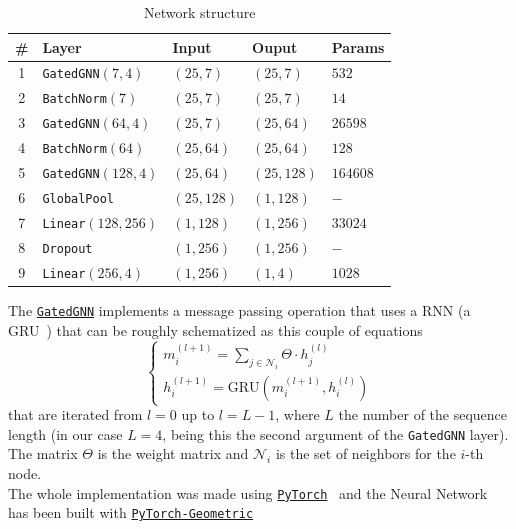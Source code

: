 \documentclass[a4paper]{article}
\begin{document}
\begin{table}[h]
\begin{tabular}{cllll}
\toprule
\# & Layer            & Input     & Ouput     & Params \\
\midrule
1      & \texttt{GatedGNN}$(7,4)$    & $(25, 7)$   & $(25, 7)$   & $532$             \\
2      & \texttt{BatchNorm}$(7)$     & $(25, 7)$   & $(25, 7)$   & $14$              \\
3      & \texttt{GatedGNN}$(64,4)$   & $(25, 7)$   & $(25, 64)$  & $26598$           \\
4      & \texttt{BatchNorm}$(64)$    & $(25, 64)$  & $(25, 64)$  & $128$             \\
5      & \texttt{GatedGNN}$(128,4)$  & $(25, 64)$  & $(25, 128)$ & $164608$          \\
6      & \texttt{GlobalPool}         & $(25, 128)$ & $(1, 128)$  & $-$               \\
7      & \texttt{Linear}$(128, 256)$ & $(1, 128)$  & $(1, 256)$  & $33024$           \\
8      & \texttt{Dropout}            & $(1, 256)$  & $(1, 256)$  & $-$               \\
9      & \texttt{Linear}$(256, 4)$   & $(1,256)$   & $(1,4)$     & $1028$            \\
\bottomrule
\end{tabular}
\caption{Network structure}
\label{tab:net}
\end{table}

The \href{https://pytorch-geometric.readthedocs.io/en/latest/modules/nn.html#torch_geometric.nn.conv.GatedGraphConv}{\texttt{GatedGNN}} implements a message passing operation that uses a RNN (a GRU~\cite{gru}) that can be roughly schematized as this couple of equations
\begin{equation}
    \begin{cases}
    m_i^{(l+1)} = \sum_{j \in \mathcal{N}_i} \Theta \cdot h_j^{(l)} \\
    h_i^{(l+1)} = \text{GRU}(m_i^{(l+1)}, h_i^{(l)})
    \label{eq:loop}
    \end{cases}
\end{equation}
that are iterated from $l=0$ up to $l=L-1$, where $L$ the number of the sequence length (in our case $L=4$, being this the second argument of the \texttt{GatedGNN} layer). The matrix $\Theta$ is the weight matrix and $\mathcal{N}_i$ is the set of neighbors for the $i$-th node. \\
The whole implementation was made using \href{https://pytorch.org/}{\texttt{PyTorch}}~\cite{paszke2017automatic} and the Neural Network has been built with \href{https://pytorch-geometric.readthedocs.io/en/latest/}{\texttt{PyTorch-Geometric}}~\cite{Fey/Lenssen/2019}
\end{document}
